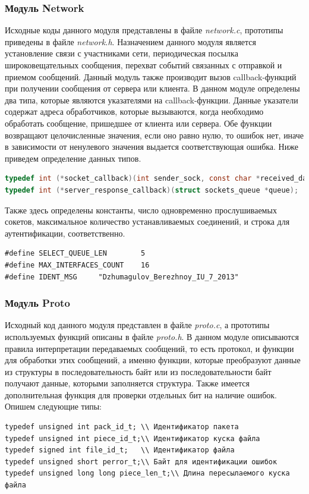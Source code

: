 \subsubsection*{Модуль Network}
Исходные коды данного модуля представлены в файле \textit{network.c}, прототипы
приведены в файле \textit{network.h}. Назначением данного модуля является
установление связи с участниками сети, периодическая посылка
широковещательных сообщения, перехват событий связанных с отправкой и
приемом сообщений. Данный модуль также производит вызов callback-функций
при получении сообщения от сервера или клиента.
\newpar
В данном модуле определены два типа, которые являются указателями на
callback-функции. Данные указатели содержат адреса обработчиков, которые
вызываются, когда необходимо обработать сообщение, пришедшее от клиента
или сервера. Обе функции возвращают целочисленные значения, если оно
равно нулю, то ошибок нет, иначе в зависимости от ненулевого значения
выдается соответствующая ошибка. Ниже приведем определение данных
типов.
\begin{lstlisting}[language=C]
typedef int (*socket_callback)(int sender_sock, const char *received_data, size_t data_len);
typedef int (*server_response_callback)(struct sockets_queue *queue);
\end{lstlisting}
\newpar
Также здесь определены константы, число одновременно прослушиваемых
сокетов, максимальное количество устанавливаемых соединений, и строка
для аутентификации, соответственно.
\begin{lstlisting}
#define SELECT_QUEUE_LEN        5
#define MAX_INTERFACES_COUNT    16
#define IDENT_MSG     "Dzhumagulov_Berezhnoy_IU_7_2013"
\end{lstlisting}

\subsubsection*{Модуль Proto}
Исходный код данного модуля представлен в файле \textit{proto.c}, а прототипы
используемых функций описаны в файле \textit{proto.h}. В данном модуле
описываются правила интерпретации передаваемых сообщений, то есть
протокол, и функции для обработки этих сообщений, а именно функции,
которые преобразуют данные из структуры в последовательность байт или из
последовательности байт получают данные, которыми заполняется структура.
Также имеется дополнительная функция для проверки отдельных бит на
наличие ошибок.
\newpar
Опишем следующие типы:
\begin{lstlisting}
typedef unsigned int pack_id_t; \\ Идентификатор пакета
typedef unsigned int piece_id_t;\\ Идентификатор куска файла
typedef signed int file_id_t;   \\ Идентификатор файла
typedef unsigned short perror_t;\\ Байт для идентификации ошибок
typedef unsigned long long piece_len_t;\\ Длина пересылаемого куска файла
\end{lstlisting}


